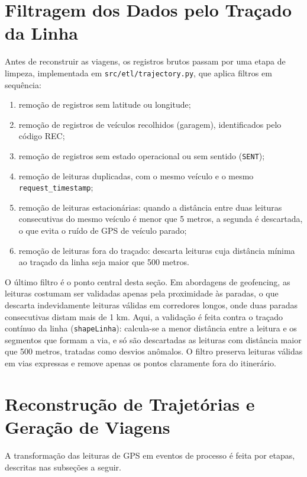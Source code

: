 \section{Filtragem dos Dados pelo Traçado da Linha}\label{sec:filtragemShape}

Antes de reconstruir as viagens, os registros brutos passam por uma etapa de limpeza, implementada em \texttt{src/etl/trajectory.py}, que aplica filtros em sequência:

\begin{enumerate}
  \item remoção de registros sem latitude ou longitude;
  \item remoção de registros de veículos recolhidos (garagem), identificados pelo código REC;
  \item remoção de registros sem estado operacional ou sem sentido (\texttt{SENT});
  \item remoção de leituras duplicadas, com o mesmo veículo e o mesmo \texttt{request\_timestamp};
  \item remoção de leituras estacionárias: quando a distância entre duas leituras consecutivas do mesmo veículo é menor que 5 metros, a segunda é descartada, o que evita o ruído de GPS de veículo parado;
  \item remoção de leituras fora do traçado: descarta leituras cuja distância mínima ao traçado da linha seja maior que 500 metros.
\end{enumerate}

O último filtro é o ponto central desta seção. Em abordagens de geofencing, as leituras costumam ser validadas apenas pela proximidade às paradas, o que descarta indevidamente leituras válidas em corredores longos, onde duas paradas consecutivas distam mais de 1 km. Aqui, a validação é feita contra o traçado contínuo da linha (\texttt{shapeLinha}): calcula-se a menor distância entre a leitura e os segmentos que formam a via, e só são descartadas as leituras com distância maior que 500 metros, tratadas como desvios anômalos. O filtro preserva leituras válidas em vias expressas e remove apenas os pontos claramente fora do itinerário.
\section{Reconstrução de Trajetórias e Geração de Viagens}\label{sec:reconstrucao}

A transformação das leituras de GPS em eventos de processo é feita por etapas, descritas nas subseções a seguir.

